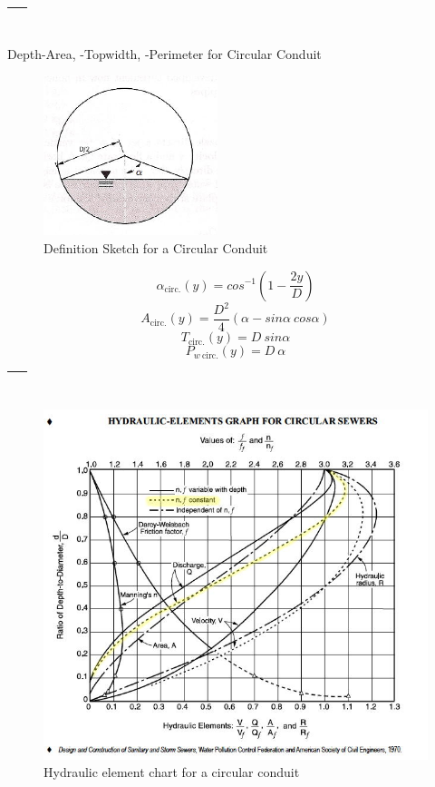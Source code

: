 \documentclass[12pt]{article}
\begin{document}
\begin{tabular}{p{6in}}
~\\ \hline
\end{tabular}

Depth-Area, -Topwidth, -Perimeter for Circular Conduit
\begin{figure}[h!] %
   \centering
   \includegraphics[width=2in]{CircularSewer.jpg} 
   \caption{Definition Sketch for a Circular Conduit}
   \label{fig:CircularSewer.jpg}
\end{figure}
\begin{equation}
\alpha_{\text{circ.}}(y) = cos^{-1}(1-\frac{2y}{D})
\end{equation}
\begin{equation}
A_{\text{circ.}}(y) = \frac{D^2}{4}(\alpha - sin\alpha~cos\alpha)
\end{equation}
\begin{equation}
T_{\text{circ.}}(y) = D~sin\alpha
\end{equation}
\begin{equation}
P_{w~\text{circ.}}(y) = D~\alpha
\end{equation}

\begin{tabular}{p{6in}}
~\\ \hline
\end{tabular}

\begin{figure}[h!] %
   \centering
   \includegraphics[width=6in]{hydraulic-element-chart.jpg} 
   \caption{Hydraulic element chart for a circular conduit}
   \label{fig:hydraulic-element-chart.jpg}
\end{figure}
\end{document}
